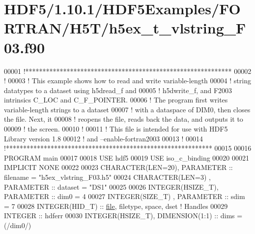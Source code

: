 \hypertarget{_h_d_f5_21_810_81_2_h_d_f5_examples_2_f_o_r_t_r_a_n_2_h5_t_2h5ex__t__vlstring___f03_8f90_source}{}\section{H\+D\+F5/1.10.1/\+H\+D\+F5\+Examples/\+F\+O\+R\+T\+R\+A\+N/\+H5\+T/h5ex\+\_\+t\+\_\+vlstring\+\_\+\+F03.f90}
\label{_h_d_f5_21_810_81_2_h_d_f5_examples_2_f_o_r_t_r_a_n_2_h5_t_2h5ex__t__vlstring___f03_8f90_source}

\begin{DoxyCode}
00001 \textcolor{comment}{!************************************************************}
00002 \textcolor{comment}{!}
00003 \textcolor{comment}{!  This example shows how to read and write variable-length}
00004 \textcolor{comment}{!  string datatypes to a dataset using h5dread\_f and}
00005 \textcolor{comment}{!  h5dwrite\_f, and F2003 intrinsics C\_LOC and C\_F\_POINTER.  }
00006 \textcolor{comment}{!  The program first writes variable-length strings to a dataset }
00007 \textcolor{comment}{!  with a dataspace of DIM0, then closes the file.  Next, it }
00008 \textcolor{comment}{!  reopens the file, reads back the data, and outputs it to }
00009 \textcolor{comment}{!  the screen.}
00010 \textcolor{comment}{!}
00011 \textcolor{comment}{!  This file is intended for use with HDF5 Library version 1.8}
00012 \textcolor{comment}{!  and --enable-fortran2003}
00013 \textcolor{comment}{!}
00014 \textcolor{comment}{!************************************************************}
00015 
00016 \textcolor{keyword}{PROGRAM} main
00017 
00018   \textcolor{keywordtype}{USE }hdf5
00019   \textcolor{keywordtype}{USE }iso\_c\_binding
00020   
00021   \textcolor{keywordtype}{IMPLICIT NONE}
00022 
00023   \textcolor{keywordtype}{CHARACTER(LEN=20)}, \textcolor{keywordtype}{PARAMETER} :: filename = \textcolor{stringliteral}{"h5ex\_vlstring\_F03.h5"}
00024   \textcolor{keywordtype}{CHARACTER(LEN=3)} , \textcolor{keywordtype}{PARAMETER} :: dataset  = \textcolor{stringliteral}{"DS1"}
00025 
00026   \textcolor{keywordtype}{INTEGER(HSIZE\_T)}, \textcolor{keywordtype}{PARAMETER} :: dim0 = 4
00027   \textcolor{keywordtype}{INTEGER(SIZE\_T)} , \textcolor{keywordtype}{PARAMETER} :: sdim = 7
00028   \textcolor{keywordtype}{INTEGER(HID\_T)}  :: \hyperlink{structfile}{file}, filetype, space, dset \textcolor{comment}{! Handles}
00029   \textcolor{keywordtype}{INTEGER} :: hdferr
00030   \textcolor{keywordtype}{INTEGER(HSIZE\_T)}, \textcolor{keywordtype}{DIMENSION(1:1)} :: dims = (/dim0/)

\end{DoxyCode}
